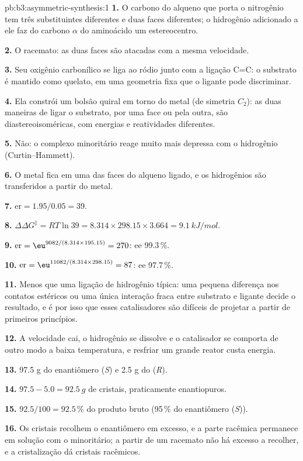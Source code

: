 \begin{solution}{pb:b3:asymmetric-synthesis:1}
\textbf{1.} O carbono do alqueno que porta o nitrogênio tem três substituintes diferentes
e duas faces diferentes; o hidrogênio adicionado a ele faz do carbono $\alpha$ do
aminoácido um estereocentro.

\textbf{2.} O racemato: as duas faces são atacadas com a mesma velocidade.

\textbf{3.} Seu oxigênio carbonílico se liga ao ródio junto com a ligação C=C: o substrato é
mantido como quelato, em uma geometria fixa que o ligante pode discriminar.

\textbf{4.} Ela constrói um bolsão quiral em torno do metal (de simetria $C_2$): as duas maneiras de
ligar o substrato, por uma face ou pela outra, são diastereoisoméricas, com energias e
reatividades diferentes.

\textbf{5.} Não: o complexo minoritário reage muito mais depressa com o hidrogênio (Curtin--Hammett).

\textbf{6.} O metal fica em uma das faces do alqueno ligado, e os hidrogênios são
transferidos a partir do metal.

\textbf{7.} $\mathrm{er} = 1.95/0.05 = 39$.

\textbf{8.} $\Delta\Delta G^\ddagger = RT\ln 39 = 8.314 \times 298.15 \times 3.664 = \qty{9.1}{kJ/mol}$.

\textbf{9.} $\mathrm{er} = \eu^{9082/(8.314 \times 195.15)} = 270$: ee 99.3\,\%.

\textbf{10.} $\mathrm{er} = \eu^{11082/(8.314 \times 298.15)} = 87$: ee 97.7\,\%.

\textbf{11.} Menos que uma ligação de hidrogênio típica: uma pequena diferença nos contatos
estéricos ou uma única interação fraca entre substrato e ligante decide o
resultado, e é por isso que esses catalisadores são difíceis de projetar a partir de primeiros princípios.

\textbf{12.} A velocidade cai, o hidrogênio se dissolve e o catalisador se comporta de outro modo
a baixa temperatura, e resfriar um grande reator custa energia.

\textbf{13.} 97.5 g do enantiômero (\textit{S}) e 2.5 g do (\textit{R}).

\textbf{14.} $97.5 - 5.0 = \qty{92.5}{g}$ de cristais, praticamente enantiopuros.

\textbf{15.} $92.5/100 = 92.5$\,\% do produto bruto (95\,\% do enantiômero (\textit{S})).

\textbf{16.} Os cristais recolhem o enantiômero em excesso, e a parte racêmica permanece em
solução com o minoritário; a partir de um racemato não há excesso a recolher, e a
cristalização dá cristais racêmicos.


\end{solution}
